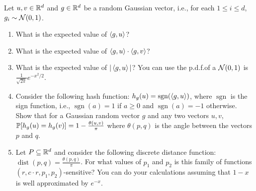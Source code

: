 \documentclass[10pt]{article}
\newcommand{\dist}{\operatorname{dist}}
\newcommand{\sgn}{\operatorname{sgn}}
\begin{document}
\begin{problem}[Problem 3]
Let \( u,v\in\mathbb{R}^d \) and \( g\in \mathbb{R}^d \) be a random Gaussian vector, i.e., for each \( 1\leq i\leq d \), \( g_i\sim \mathcal{N}(0,1) \).
\begin{enumerate}[label=(\alph*),nolistsep]
    \item What is the expected value of \( \left\langle g,u \right\rangle \)?
    \item What is the expected value of \( \left\langle g,u \right\rangle\cdot\left\langle g,v \right\rangle \)?
    \item What is the expected value of \( |\left\langle g,u \right\rangle| \)? You can use the p.d.f.of a \( \mathcal{N}(0,1) \) is \( \frac{1}{\sqrt{2\pi}} e^{-x^2/2} \).
    \item Consider the following hash function: \( h_g(u) = \sgn(\ip{g,u}) \), where \( \sgn \) is the sign function, i.e., \( \sgn(a) = 1 \) if \( a\geq 0 \) and \( \sgn(a) = -1 \) otherwise. Show that for a Gaussian random vector \( g \) and any two vectors \( u,v \), \( \mathbb{P}[h_g(u) = h_g(v)] = 1-\frac{\theta(u,v)}{\pi} \) where \( \theta(p,q) \) is the angle between the vectors \( p \) and \( q \).
    \item Let \( P\subseteq \mathbb{R}^d \) and consider the following discrete distance function: \( \dist(p,q) = \frac{\theta(p,q)}{\pi} \). For what values of \( p_1 \) and \( p_2 \) is this family of functions \( (r,c\cdot r,p_1,p_2) \)-sensitive? You can do your calculations assuming that \( 1-x \) is well approximated by \( e^{-x} \).
\end{enumerate}
\end{problem}
\end{document}
